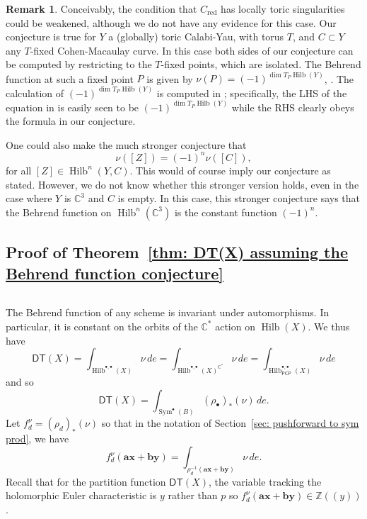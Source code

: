 \documentclass[12pt]{amsart}
\theoremstyle{definition}
\newtheorem{remark}[theorem]{Remark}
\newcommand{\CC} {\mathbb{C}}          %
\newcommand{\ZZ} {\mathbb{Z}}		%
\newcommand{\Sym}{\operatorname{Sym}}
\newcommand{\Hilb}{\operatorname{Hilb}}
\newcommand{\DT}{\mathsf{DT}}
\newcommand{\boldx}{\boldsymbol{x}}
\newcommand{\boldy}{\boldsymbol{y}}
\newcommand{\bolda}{\boldsymbol{a}}
\newcommand{\boldb}{\boldsymbol{b}}
\newcommand{\PCP}{\mathsf{PCP}}
\newcommand{\red}{\mathrm{red}}
\newcommand{\SubSecSpace}{$\,$\vspace{0.2cm}\par } %
\begin{document}
\begin{remark}
Conceivably, the condition that $C_{\red}$ has locally toric
singularities could be weakened, although we do not have any evidence
for this case. Our conjecture is true for $Y$ a (globally) toric
Calabi-Yau, with torus $T$, and $C \subset Y$ any $T$-fixed
Cohen-Macaulay curve. In this case both sides of our conjecture can be
computed by restricting to the $T$-fixed points, which are
isolated. The Behrend function at such a fixed point $P$ is given by $\nu(P) =
(-1)^{\dim T_P\Hilb (Y)}$, \cite[Thm.~3.4]{Behrend-Fantechi08}. The
calculation of $(-1)^{\dim T_{P}\Hilb (Y)}$ is computed in \cite{MNOP1};
specifically, the LHS of the equation in \cite[Thm~2]{MNOP1} is easily
seen to be $(-1)^{\dim T_{P}\Hilb (Y)}$ while the RHS clearly obeys the
formula in our conjecture.

One could also make the much stronger conjecture that 
\[
\nu ([Z]) = (-1)^{n} \nu ([C]),
\]
for all $[Z]\in \Hilb^{n}(Y,C)$. This would of course imply our
conjecture as stated. However, we do not know whether this stronger version
holds, even in the case where $Y$ is $\CC^{3}$ and $C$ is empty. In
this case, this stronger conjecture says that the Behrend function
on $\Hilb^{n}(\CC^{3})$ is the constant function $(-1)^{n}$.
\end{remark}


\subsection{Proof of Theorem~\ref{thm: DT(X) assuming the Behrend
function conjecture}}\SubSecSpace 

The Behrend function of any scheme is invariant under
automorphisms. In particular, it is constant on the orbits of the
$\CC^{*}$ action on $\Hilb (X)$. We thus have
\[
\DT (X) = \int_{\Hilb^{\bullet ,\bullet}(X)} \nu \, de =
\int_{\Hilb^{\bullet ,\bullet}(X)^{\CC^{*}}} \nu \, de =
\int_{\Hilb_{\PCP }^{\bullet ,\bullet}(X)} \nu \, de
\]
and so
\[
\DT (X)  =\int_{\Sym^{\bullet}(B)} (\rho_{\bullet})_{*} (\nu )\, de.
\]
Let $f^{\nu}_{d} = (\rho_{d})_{*}(\nu )$ so that in the notation of
Section~\ref{sec: pushforward to sym prod}, we have
\[
f^{\nu}_{d}(\bolda \boldx +\boldb \boldy ) =
\int_{\rho^{-1}_{d}(\bolda \boldx +\boldb \boldy )} \nu \, de.
\]
Recall that for the partition function $\DT (X)$, the variable
tracking the holomorphic Euler characteristic is $y$ rather than $p$
so $f_{d}^{\nu}(\bolda \boldx +\boldb \boldy )\in \ZZ (\!(y)\!)$.
\end{document}
